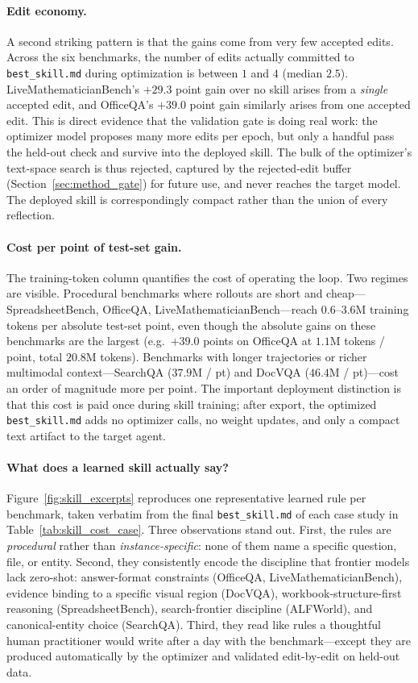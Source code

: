 \paragraph{Edit economy.}
A second striking pattern is that the gains come from very few accepted edits. Across the six benchmarks, the number of edits actually committed to \texttt{best\_skill.md} during optimization is between $1$ and $4$ (median $2.5$). LiveMathematicianBench's $+29.3$ point gain over no skill arises from a \emph{single} accepted edit, and OfficeQA's $+39.0$ point gain similarly arises from one accepted edit. This is direct evidence that the validation gate is doing real work: the optimizer model proposes many more edits per epoch, but only a handful pass the held-out check and survive into the deployed skill. The bulk of the optimizer's text-space search is thus rejected, captured by the rejected-edit buffer (Section~\ref{sec:method_gate}) for future use, and never reaches the target model. The deployed skill is correspondingly compact rather than the union of every reflection.

\paragraph{Cost per point of test-set gain.}
The training-token column quantifies the cost of operating the loop. Two regimes are visible. Procedural benchmarks where rollouts are short and cheap---SpreadsheetBench, OfficeQA, LiveMathematicianBench---reach $0.6$--$3.6$M training tokens per absolute test-set point, even though the absolute gains on these benchmarks are the largest (e.g.\ $+39.0$ points on OfficeQA at $1.1$M tokens / point, total $20.8$M tokens). Benchmarks with longer trajectories or richer multimodal context---SearchQA ($37.9$M / pt) and DocVQA ($46.4$M / pt)---cost an order of magnitude more per point. The important deployment distinction is that this cost is paid once during skill training; after export, the optimized \texttt{best\_skill.md} adds no optimizer calls, no weight updates, and only a compact text artifact to the target agent.

\paragraph{What does a learned skill actually say?}
Figure~\ref{fig:skill_excerpts} reproduces one representative learned rule per benchmark, taken verbatim from the final \texttt{best\_skill.md} of each case study in Table~\ref{tab:skill_cost_case}. Three observations stand out. First, the rules are \emph{procedural} rather than \emph{instance-specific}: none of them name a specific question, file, or entity. Second, they consistently encode the discipline that frontier models lack zero-shot: answer-format constraints (OfficeQA, LiveMathematicianBench), evidence binding to a specific visual region (DocVQA), workbook-structure-first reasoning (SpreadsheetBench), search-frontier discipline (ALFWorld), and canonical-entity choice (SearchQA). Third, they read like rules a thoughtful human practitioner would write after a day with the benchmark---except they are produced automatically by the optimizer and validated edit-by-edit on held-out data.

